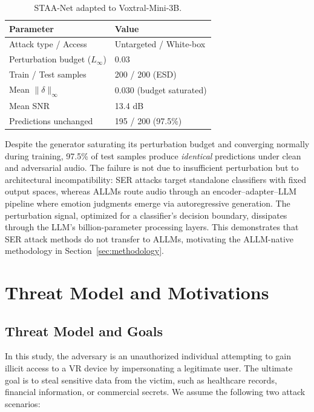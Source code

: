 \documentclass[sigconf]{acmart}
\begin{document}
\begin{table}[t]
\centering
\caption{STAA-Net adapted to Voxtral-Mini-3B.}
\label{tab:q3_results}
\begin{tabular}{ll}
\toprule
\textbf{Parameter} & \textbf{Value} \\
\midrule
Attack type / Access & Untargeted / White-box \\
Perturbation budget ($L_\infty$) & 0.03 \\
Train / Test samples & 200 / 200 (ESD) \\
\midrule
Mean $\|\delta\|_\infty$ & 0.030 (budget saturated) \\
Mean SNR & 13.4 dB \\
Predictions unchanged & 195 / 200 (97.5\%) \\
\bottomrule
\end{tabular}
\end{table}

Despite the generator saturating its perturbation budget and converging normally during training, 97.5\% of test samples produce \textit{identical} predictions under clean and adversarial audio. The failure is not due to insufficient perturbation but to architectural incompatibility: SER attacks target standalone classifiers with fixed output spaces, whereas ALLMs route audio through an encoder--adapter--LLM pipeline where emotion judgments emerge via autoregressive generation. The perturbation signal, optimized for a classifier's decision boundary, dissipates through the LLM's billion-parameter processing layers. This demonstrates that SER attack methods do not transfer to ALLMs, motivating the ALLM-native methodology in Section~\ref{sec:methodology}.
\section{Threat Model and Motivations}
\label{sec:Motivation}





\subsection{Threat Model and Goals}

In this study, the adversary is an unauthorized individual attempting to gain illicit access to a VR device by impersonating a legitimate user. The ultimate goal is to steal sensitive data from the victim, such as healthcare records, financial information, or commercial secrets. We assume the following two attack scenarios:
\end{document}
